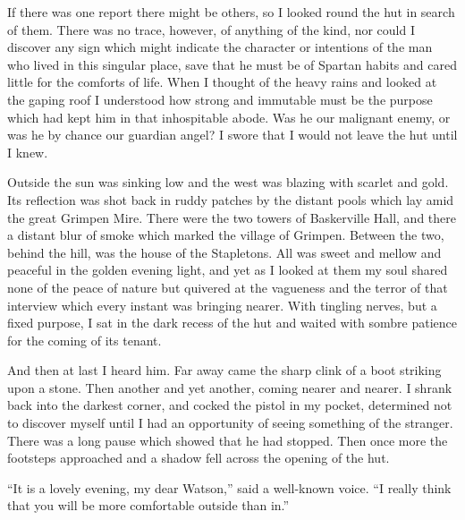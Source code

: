 \documentclass[paper=5.5in:8.5in,BCOR=7mm,twoside,DIV=calc,12pt,usegeometry,openany,chapterprefix,endperiod,headings=big]{scrbook} %
\begin{document}
If there was one report there might be others, so I looked round the hut in search of them. There was no trace, however, of anything of the kind, nor could I discover any sign which might indicate the character or intentions of the man who lived in this singular place, save that he must be of Spartan habits and cared little for the comforts of life. When I thought of the heavy rains and looked at the gaping roof I understood how strong and immutable must be the purpose which had kept him in that inhospitable abode. Was he our malignant enemy, or was he by chance our guardian angel? I swore that I would not leave the hut until I knew.

Outside the sun was sinking low and the west was blazing with scarlet and gold. Its reflection was shot back in ruddy patches by the distant pools which lay amid the great Grimpen Mire. There were the two towers of Baskerville Hall, and there a distant blur of smoke which marked the village of Grimpen. Between the two, behind the hill, was the house of the Stapletons. All was sweet and mellow and peaceful in the golden evening light, and yet as I looked at them my soul shared none of the peace of nature but quivered at the vagueness and the terror of that interview which every instant was bringing nearer. With tingling nerves, but a fixed purpose, I sat in the dark recess of the hut and waited with sombre patience for the coming of its tenant.

And then at last I heard him. Far away came the sharp clink of a boot striking upon a stone. Then another and yet another, coming nearer and nearer. I shrank back into the darkest corner, and cocked the pistol in my pocket, determined not to discover myself until I had an opportunity of seeing something of the stranger. There was a long pause which showed that he had stopped. Then once more the footsteps approached and a shadow fell across the opening of the hut.

\enquote{It is a lovely evening, my dear Watson,} said a well-known voice. \enquote{I really think that you will be more comfortable outside than in.}
\end{document}
